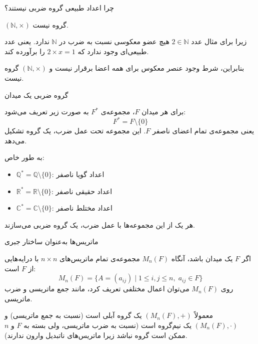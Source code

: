 \begin{frame}[t]{چرا اعداد طبیعی گروه ضربی نیستند؟}
    \begin{example}
        \( (\mathbb{N}, \times) \) گروه نیست.

        زیرا برای مثال عدد \( 2 \in \mathbb{N} \) هیچ عضو معکوسی نسبت به ضرب در \( \mathbb{N} \) ندارد.
        یعنی عدد طبیعی‌ای وجود ندارد که \( 2 \times x = 1 \) را برآورده کند.

        بنابراین، شرط وجود عنصر معکوس برای همه اعضا برقرار نیست و \( (\mathbb{N}, \times) \) گروه نیست.
    \end{example}


\end{frame}

\begin{frame}[t]{گروه ضربی یک میدان}
    \begin{definition}
        برای هر میدان \( F \)، مجموعه‌ی \( F^* \) به صورت زیر تعریف می‌شود:
        \[
            F^* = F \setminus \{0\}
        \]
        یعنی مجموعه‌ی تمام اعضای ناصفر \( F \). این مجموعه تحت عمل ضرب، یک گروه تشکیل می‌دهد.

        به طور خاص:
        \begin{itemize}
            \item \( \mathbb{Q}^* = \mathbb{Q} \setminus \{0\} \): اعداد گویا ناصفر
            \item \( \mathbb{R}^* = \mathbb{R} \setminus \{0\} \): اعداد حقیقی ناصفر
            \item \( \mathbb{C}^* = \mathbb{C} \setminus \{0\} \): اعداد مختلط ناصفر
        \end{itemize}
        هر یک از این مجموعه‌ها با عمل ضرب، یک گروه ضربی می‌سازند.
    \end{definition}
\end{frame}

\begin{frame}[t]{ماتریس‌ها به‌عنوان ساختار جبری}
    \begin{definition}
        اگر \( F \) یک میدان  باشد، آنگاه \( M_n(F) \) مجموعه‌ی تمام ماتریس‌های \( n \times n \) با درایه‌هایی از \( F \) است:
        \[
            M_n(F) = \{ A = (a_{ij}) \mid 1 \leq i, j \leq n,\; a_{ij} \in F \}
        \]
        روی \( M_n(F) \) می‌توان اعمال مختلفی تعریف کرد، مانند جمع ماتریسی و ضرب ماتریسی.

        معمولاً \( (M_n(F), +) \) یک گروه آبلی است (نسبت به جمع ماتریسی) و \( (M_n(F), \cdot) \) یک نیم‌گروه است (نسبت به ضرب ماتریسی، ولی بسته به \( F \) و \( n \) ممکن است گروه نباشد زیرا ماتریس‌های ناتبدیل وارون ندارند).
    \end{definition}


\end{frame}

